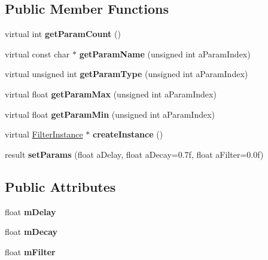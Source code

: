 \subsection*{Public Member Functions}
\begin{DoxyCompactItemize}
\item 
\mbox{\label{class_so_loud_1_1_echo_filter_ad571528ea4ff6c886d249bf55c77b006}} 
virtual int {\bfseries get\+Param\+Count} ()
\item 
\mbox{\label{class_so_loud_1_1_echo_filter_aa4509d928d70a691a3ccd01148aee33c}} 
virtual const char $\ast$ {\bfseries get\+Param\+Name} (unsigned int a\+Param\+Index)
\item 
\mbox{\label{class_so_loud_1_1_echo_filter_a71a0f52491073ee3420130527decfba8}} 
virtual unsigned int {\bfseries get\+Param\+Type} (unsigned int a\+Param\+Index)
\item 
\mbox{\label{class_so_loud_1_1_echo_filter_a7a0a11e16cba5eab20220efc6b069824}} 
virtual float {\bfseries get\+Param\+Max} (unsigned int a\+Param\+Index)
\item 
\mbox{\label{class_so_loud_1_1_echo_filter_ac31bab895048dce5fd43889a41f5c033}} 
virtual float {\bfseries get\+Param\+Min} (unsigned int a\+Param\+Index)
\item 
\mbox{\label{class_so_loud_1_1_echo_filter_ae7df706ce44f04472cae1d8a510d458e}} 
virtual \mbox{\hyperlink{class_so_loud_1_1_filter_instance}{Filter\+Instance}} $\ast$ {\bfseries create\+Instance} ()
\item 
\mbox{\label{class_so_loud_1_1_echo_filter_adf9a75c94ca8451d7ab599e4cd9387bd}} 
result {\bfseries set\+Params} (float a\+Delay, float a\+Decay=0.\+7f, float a\+Filter=0.\+0f)
\end{DoxyCompactItemize}
\subsection*{Public Attributes}
\begin{DoxyCompactItemize}
\item 
\mbox{\label{class_so_loud_1_1_echo_filter_a14a5bdf6c0bb264dc4fb517961fc8e13}} 
float {\bfseries m\+Delay}
\item 
\mbox{\label{class_so_loud_1_1_echo_filter_a1e11873461a6393defa8ed04cea81a69}} 
float {\bfseries m\+Decay}
\item 
\mbox{\label{class_so_loud_1_1_echo_filter_ab7fa97fec38e74941837b6ed0853e3c3}} 
float {\bfseries m\+Filter}
\end{DoxyCompactItemize}



